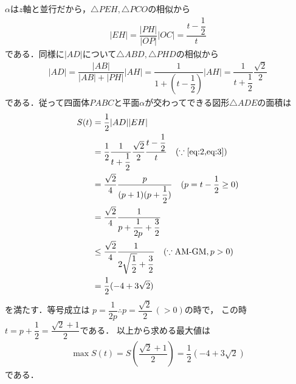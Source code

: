 \documentclass[../../main.tex]{subfiles}
\begin{document}
$\alpha$は$z$軸と並行だから，$\triangle PEH, \triangle PCO$の相似から
\begin{align}
  |EH| = \dfrac{|PH|}{|OP|}|OC| = \dfrac{t - \dfrac{1}{2}}{t} \label{eq:2}
\end{align}
である．同様に$|AD|$について$\triangle ABD, \triangle PHD$の相似から
\begin{align}
  |AD|
  = \dfrac{|AB|}{|AB|+|PH|}|AH|
  = \dfrac{1}{1 + (t - \dfrac{1}{2})} |AH|
  = \dfrac{1}{t + \dfrac{1}{2}} \dfrac{\sqrt{2}}{2} \label{eq:3}
\end{align}
である．従って四面体$PABC$と平面$\alpha$が交わってできる図形$\triangle ADE$の面積は
\begin{align}
  S(t)
  & = \dfrac{1}{2} |AD||EH| \\
  & = \dfrac{1}{2} \dfrac{1}{t + \dfrac{1}{2}} \dfrac{\sqrt{2}}{2} \dfrac{t - \dfrac{1}{2}}{t} \quad (\because \text{\cref{eq:2,eq:3}}) \\
  & = \dfrac{\sqrt{2}}{4} \dfrac{p}{(p + 1)(p + \dfrac{1}{2})} \quad (p = t - \dfrac{1}{2} \ge 0) \\
  & = \dfrac{\sqrt{2}}{4} \dfrac{1}{p + \dfrac{1}{2p} + \dfrac{3}{2}} \\
  & \le \dfrac{\sqrt{2}}{4} \dfrac{1}{2\sqrt{\dfrac{1}{2}} + \dfrac{3}{2}} \quad (\because \text{AM-GM}, p > 0) \\
  & = \dfrac{1}{2}(-4 + 3\sqrt{2})
\end{align}
を満たす．等号成立は $p = \dfrac{1}{2p} \therefore p = \dfrac{\sqrt{2}}{2} \ (>0)$の時で，
この時$t=p+\dfrac{1}{2}=\dfrac{\sqrt{2}+1}{2}$である．
以上から求める最大値は
\begin{align}
  \max S(t) = S(\dfrac{\sqrt{2}+1}{2}) = \dfrac{1}{2}(-4 + 3\sqrt{2})
\end{align}
である．
\end{document}
